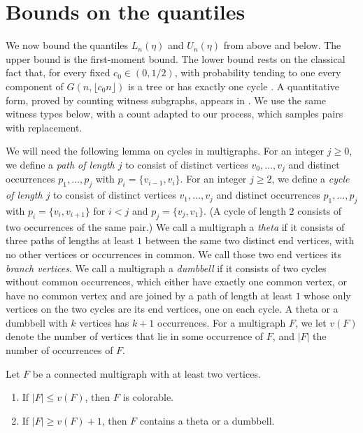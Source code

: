 \section{Bounds on the quantiles}\label{sec:pre-centre}

We now bound the quantiles $L_n(\eta)$ and $U_n(\eta)$ from above and below. The upper bound is the first-moment bound. The lower bound rests on the classical fact that, for every fixed $c_0 \in (0, 1/2)$, with probability tending to one every component of $G(n, \lfloor c_0 n \rfloor)$ is a tree or has exactly one cycle \cite[Theorem~5e]{erdos1960evolution}. A quantitative form, proved by counting witness subgraphs, appears in \cite[Theorem~5.5 and its proof, pp.~112--113]{janson2000random}. We use the same witness types below, with a count adapted to our process, which samples pairs with replacement.

We will need the following lemma on cycles in multigraphs. For an integer $j \ge 0$, we define a \emph{path of length $j$} to consist of distinct vertices $v_0, \dots, v_j$ and distinct occurrences $p_1, \dots, p_j$ with $p_i = \{v_{i - 1}, v_i\}$. For an integer $j \ge 2$, we define a \emph{cycle of length $j$} to consist of distinct vertices $v_1, \dots, v_j$ and distinct occurrences $p_1, \dots, p_j$ with $p_i = \{v_i, v_{i + 1}\}$ for $i < j$ and $p_j = \{v_j, v_1\}$. (A cycle of length $2$ consists of two occurrences of the same pair.) We call a multigraph a \emph{theta} if it consists of three paths of lengths at least $1$ between the same two distinct end vertices, with no other vertices or occurrences in common. We call those two end vertices its \emph{branch vertices}. We call a multigraph a \emph{dumbbell} if it consists of two cycles without common occurrences, which either have exactly one common vertex, or have no common vertex and are joined by a path of length at least $1$ whose only vertices on the two cycles are its end vertices, one on each cycle. A theta or a dumbbell with $k$ vertices has $k + 1$ occurrences. For a multigraph $F$, we let $v(F)$ denote the number of vertices that lie in some occurrence of $F$, and $|F|$ the number of occurrences of $F$.

\begin{lemma}\label{lem:pre-cycles}
Let $F$ be a connected multigraph with at least two vertices.
\begin{enumerate}[label=(\alph*)]
\item If $|F| \le v(F)$, then $F$ is colorable.
\item If $|F| \ge v(F) + 1$, then $F$ contains a theta or a dumbbell.
\end{enumerate}
\end{lemma}

